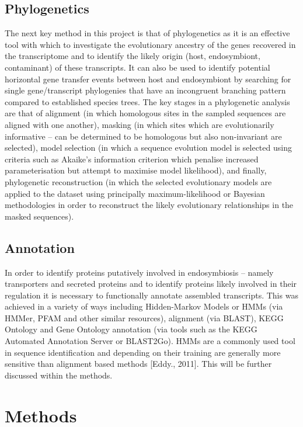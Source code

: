 \subsection{Phylogenetics}
The next key method in this project is that of phylogenetics as it is an effective tool with which to investigate the evolutionary ancestry of the genes recovered in the transcriptome and to identify the likely origin (host, endosymbiont, contaminant) of these transcripts.  
It can also be used to identify potential horizontal gene transfer events between host and endosymbiont by searching for single gene/transcript phylogenies that have an incongruent branching pattern compared to established species trees.    
The key stages in a phylogenetic analysis are that of alignment (in which homologous sites in the sampled sequences are aligned with one another), masking (in which sites which are evolutionarily informative – can be determined to be homologous but also non-invariant are selected), model selection (in which a sequence evolution model is selected using criteria such as Akaike's information criterion which penalise increased parameterisation but attempt to maximise model likelihood), and finally, phylogenetic reconstruction (in which the selected evolutionary models are applied to the dataset using principally maximum-likelihood or Bayesian methodologies in order to reconstruct the likely evolutionary relationships in the masked sequences). 

\subsection{Annotation}
In order to identify proteins putatively involved in endosymbiosis – namely transporters and secreted proteins and to identify proteins likely involved in their regulation it is necessary to functionally annotate assembled transcripts.  
This was achieved in a variety of ways including Hidden-Markov Models or HMMs (via HMMer, PFAM and other similar resources), alignment (via BLAST), KEGG Ontology and Gene Ontology annotation (via tools such as the KEGG Automated Annotation Server or BLAST2Go). 
HMMs are a commonly used tool in sequence identification and depending on their training are generally more sensitive than alignment based methods [Eddy., 2011].
This will be further discussed within the methods.

\section{Methods}
